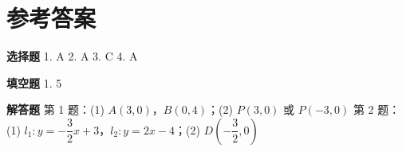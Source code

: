 \documentclass{exam-zh}
\begin{document}
\clearpage
\section*{参考答案}


\begin{keyideabox}
  \textbf{选择题}
  1. A  2. A  3. C  4. A
\end{keyideabox}



\begin{keyideabox}
  \textbf{填空题}
  1. 5
\end{keyideabox}



\begin{keyideabox}
  \textbf{解答题}
  第 1 题：(1) $A(3, 0)$，$B(0, 4)$；(2) $P(3, 0)$ 或 $P(-3, 0)$
第 2 题：(1) $l_1: y = -\dfrac{3}{2}x + 3$，$l_2: y = 2x - 4$；(2) $D\left(-\dfrac{3}{2}, 0\right)$
\end{keyideabox}
\end{document}
